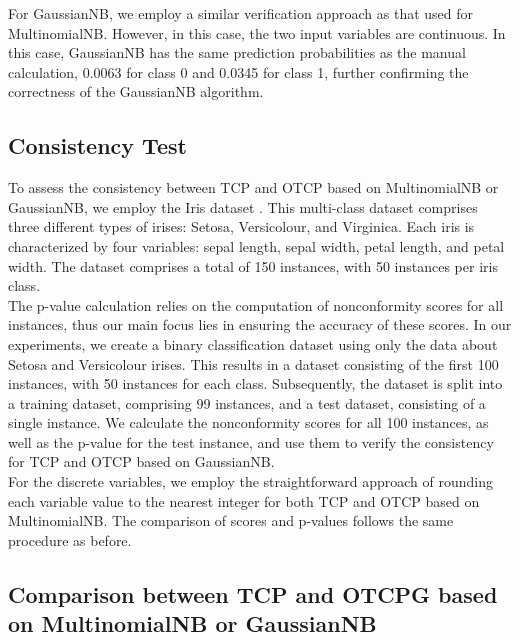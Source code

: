 \documentclass[10pt]{reportMaster}
\begin{document}
\noindent For GaussianNB, we employ a similar verification approach as that used for MultinomialNB. However, in this case, the two input variables are continuous. In this case, GaussianNB has the same prediction probabilities as the manual calculation, 0.0063 for class 0 and 0.0345 for class 1, further confirming the correctness of the GaussianNB algorithm.

\subsection{Consistency Test}

To assess the consistency between TCP and OTCP based on MultinomialNB or GaussianNB, we employ the Iris dataset \cite{fisher1936iris}. This multi-class dataset comprises three different types of irises: Setosa, Versicolour, and Virginica. Each iris is characterized by four variables: sepal length, sepal width, petal length, and petal width. The dataset comprises a total of 150 instances, with 50 instances per iris class. \\

\noindent The p-value calculation relies on the computation of nonconformity scores for all instances, thus our main focus lies in ensuring the accuracy of these scores. In our experiments, we create a binary classification dataset using only the data about Setosa and Versicolour irises. This results in a dataset consisting of the first 100 instances, with 50 instances for each class. Subsequently, the dataset is split into a training dataset, comprising 99 instances, and a test dataset, consisting of a single instance. We calculate the nonconformity scores for all 100 instances, as well as the p-value for the test instance, and use them to verify the consistency for TCP and OTCP based on GaussianNB. \\

\noindent For the discrete variables, we employ the straightforward approach of rounding each variable value to the nearest integer for both TCP and OTCP based on MultinomialNB. The comparison of scores and p-values follows the same procedure as before.

\subsection{Comparison between TCP and OTCPG based on MultinomialNB or GaussianNB}
\end{document}
